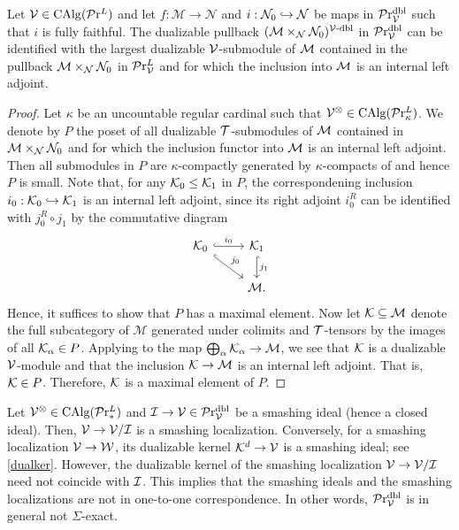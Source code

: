 \documentclass[10pt,a4paper,oneside]{article}
\begin{document}
\begin{lem}\label{dualker}
Let $\mathcal{V}\in\operatorname{CAlg}(\mathcal{P}\mathrm{r}^L)$ and let $f: \mathcal{M} \rightarrow \mathcal{N}$ and $i:\mathcal{N}_0\hookrightarrow\mathcal{N}$ be maps in $\mathcal{P}\mathrm{r}_{\mathcal{V}}^{\operatorname{dbl}}$ such that $i$ is fully faithful. The dualizable pullback $(\mathcal{M}\times_\mathcal{N}\mathcal{N}_0)^{\mathcal{V}\text{-}\mathrm{dbl}}$ in $\mathcal{P}\mathrm{r}_{\mathcal{V}}^{\operatorname{dbl}}$ can be identified with the largest dualizable $\mathcal{V}$-submodule of $\mathcal{M}$ contained in the pullback $\mathcal{M}\times_\mathcal{N}\mathcal{N}_0$ in $\mathcal{P}\mathrm{r}^L_{\mathcal{V}}$ and for which the inclusion into $\mathcal{M}$ is an internal left adjoint.
\end{lem}

\begin{proof}
Let $\kappa$ be an uncountable regular cardinal such that $\mathcal{V}^\otimes\in\operatorname{CAlg}(\mathcal{P}\mathrm{r}^L_{\kappa})$. We denote by $P$ the poset of all dualizable $\mathcal{T}$-submodules of $\mathcal{M}$ contained in $\mathcal{M}\times_\mathcal{N}\mathcal{N}_0$ and for which the inclusion functor into $\mathcal{M}$ is an internal
left adjoint. Then all submodules in $P$ are $\kappa$-compactly generated by $\kappa$-compacts of \mcm and hence $P$ is small. Note that, for any $\mathcal{K}_0\leq \mathcal{K}_1$ in $P$, the correspondening inclusion $i_0:\mathcal{K}_0\hookrightarrow \mathcal{K}_1$ is an internal left adjoint, since its right adjoint $i_0^R$ can be identified with $j_0^R\circ j_1$ by the commutative diagram
$$
\begin{tikzcd}
\mck_0 \arrow[rd, "j_0", hook] \arrow[r, "i_0", hook] & \mck_1 \arrow[d, "j_1", hook] \\
& \mcm   .                      
\end{tikzcd}
$$
Hence, it suffices to show that $P$ has a maximal element. Now let $\mathcal{K}\subseteq\mathcal{M}$ denote the full subcategory of $\mathcal{M}$ generated under colimits and $\mathcal{T}$-tensors by the images of all $\mathcal{K}_\alpha\in P$. Applying \cite[Lemma 2.61]{ramzi2024dualizable} to the map $\bigoplus_{\alpha}\mathcal{K}_\alpha \to \mathcal{M}$, we see that $\mathcal{K}$ is a dualizable $\mathcal{V}$-module and that the inclusion $\mathcal{K} \to \mathcal{M}$ is an internal left adjoint. That is, $\mathcal{K} \in P$. Therefore, $\mathcal{K}$ is a maximal element of $P$.
\end{proof}

\begin{rem}\label{rem:prdbl-non-sigma-exact}
Let $\mathcal{V}^\otimes\in\operatorname{CAlg}(\mathcal{P}\mathrm{r}^L_*)$ and $\mathcal{I}\rightarrow\mathcal{V}\in \mathcal{P}\mathrm{r}_{\mathcal{V}}^{\operatorname{dbl}}$ be a smashing ideal (hence a closed ideal). Then, $\mathcal{V}\to\mathcal{V}/\mathcal{I}$ is a smashing localization. Conversely, for a smashing localization $\mathcal{V} \to \mathcal{W}$, its dualizable kernel $\mathcal{K}^d \to \mathcal{V}$ is a smashing ideal; see \cref{dualker}. However, the dualizable kernel of the smashing localization $\mathcal{V} \to \mathcal{V} / \mathcal{I}$ need not coincide with $\mathcal{I}$. This implies that the smashing ideals and the smashing localizations are not in one-to-one correspondence. In other words, $\mathcal{P}\mathrm{r}_{\mathcal{V}}^{\operatorname{dbl}}$ is in general not $\Sigma$-exact. 
\end{rem}
\end{document}
